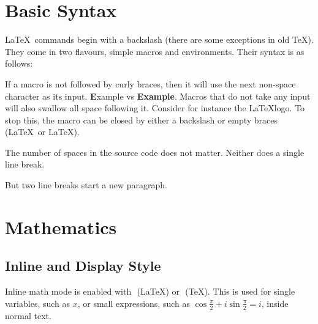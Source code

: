 \documentclass[a4paper]{memoir}
\begin{document}
\chapter{Basic Syntax}


\LaTeX\ commands begin with a backslash (there are some exceptions in old \TeX). They come in two flavours, simple macros and environments. Their syntax is as follows:



If a macro is not followed by curly braces, then it will use the next non-space character as its input. \textbf Example vs \textbf{Example}. Macros that do not take any input will also swallow all space following it. Consider for instance the \LaTeX logo. To stop this, the macro can be closed by either a backslash or empty braces (\LaTeX\ or \LaTeX{}).

The number of spaces in the source code          does        not        matter.
Neither does a single line break.

But two line breaks start a new paragraph.


\chapter{Mathematics}


\section{Inline and Display Style}
Inline math mode is enabled with \( \) (\LaTeX) or $ $ (\TeX). This is used for single variables, such as \(x\), or small expressions, such as
\(
    \cos \frac{\pi}{2} + i\sin \frac{\pi}{2} = i
\),
inside normal text.
\end{document}
